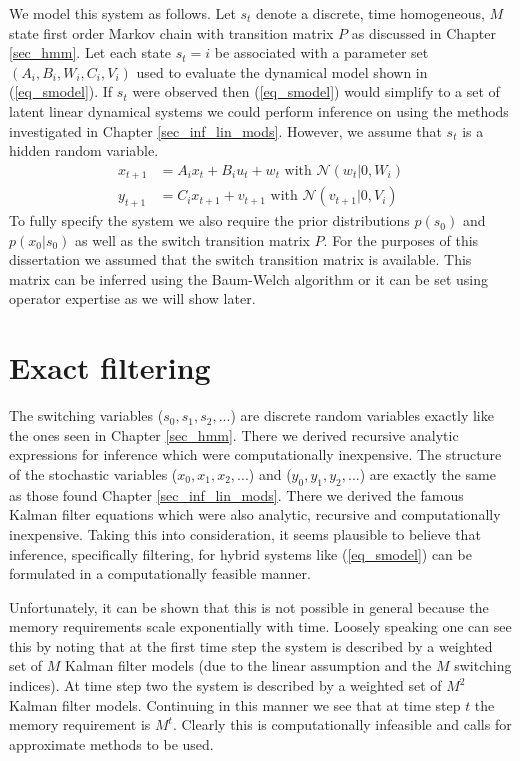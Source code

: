 We model this system as follows. Let $s_t$ denote a discrete, time homogeneous, $M$ state first order Markov chain with transition matrix $P$ as discussed in Chapter \ref{sec_hmm}. Let each state $s_t=i$ be associated with a parameter set $\left(A_i, B_i, W_i, C_i, V_i \right)$ used to evaluate the dynamical model shown in (\ref{eq_smodel}). If $s_t$ were observed then (\ref{eq_smodel}) would simplify to a set of latent linear dynamical systems we could perform inference on using the methods investigated in Chapter \ref{sec_inf_lin_mods}. However, we assume that $s_t$ is a hidden random variable.
\begin{equation}
\begin{aligned}
x_{t+1} &= A_ix_t + B_iu_t + w_{t} \text{ with } \mathcal{N}(w_{t}|0,W_i) \\
y_{t+1} &= C_ix_{t+1} + v_{t+1}  \text{ with } \mathcal{N}(v_{t+1}|0,V_i)
\end{aligned}
\label{eq_smodel}
\end{equation}
To fully specify the system we also require the prior distributions $p(s_0)$ and $p(x_0|s_0)$ as well as the switch transition matrix $P$. For the purposes of this dissertation we assumed that the switch transition matrix is available. This matrix can be inferred using the Baum-Welch algorithm \cite{murphy1} or it can be set using operator expertise as we will show later.

\section{Exact filtering}
The switching variables ($s_0, s_1, s_2,...$) are discrete random variables exactly like the ones seen in Chapter \ref{sec_hmm}. There we derived recursive analytic expressions for inference which were computationally inexpensive. The structure of the stochastic variables ($x_0, x_1,x_2,...$) and ($y_0,y_1, y_2,...$) are exactly the same as those found Chapter \ref{sec_inf_lin_mods}. There we derived the famous Kalman filter equations which were also analytic, recursive and computationally inexpensive. Taking this into consideration, it seems plausible to believe that inference, specifically filtering, for hybrid systems like (\ref{eq_smodel}) can be formulated in a computationally feasible manner. 

Unfortunately, it can be shown that this is not possible in general \cite{lerner}\cite{murphy3} because the memory requirements scale exponentially with time. Loosely speaking one can see this by noting that at the first time step the system is described by a weighted set of $M$ Kalman filter models (due to the linear assumption and the $M$ switching indices). At time step two the system is described by a weighted set of $M^2$ Kalman filter models. Continuing in this manner we see that at time step $t$ the memory requirement is $M^t$. Clearly this is computationally infeasible and calls for approximate methods to be used. 

